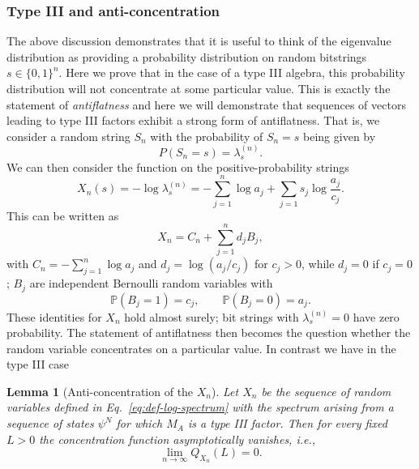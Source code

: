 \documentclass[aps,pra,reprint,superscriptaddress]{revtex4-2}
\renewcommand\l{\lambda}
\newtheorem{lemma}[theorem]{Lemma}
\theoremstyle{definition}
\theoremstyle{remark}
\begin{document}
    \subsubsection{Type III and anti-concentration}
    The above discussion demonstrates that it is useful to think of the
    eigenvalue distribution as providing a probability distribution on random
    bitstrings $s \in \{0,1 \}^n$.
    Here we prove that in the case of a type III algebra, this probability
    distribution will not concentrate at some particular value. This is 
    exactly the statement of \emph{antiflatness} \cite{Tirrito:2023fnw} and here we will
    demonstrate that sequences of vectors leading to type III factors exhibit a strong form
    of antiflatness.
    That is, we consider a random string $S_n$ with the probability
    of $S_n = s$ being given by 
    \begin{equation}
        P(S_n = s) = \l_s^{(n)}.
    \end{equation}
    We can then consider the function on the positive-probability strings
    \begin{equation}
        X_n(s)= - \log \l_s^{(n)} = -\sum_{j = 1}^{n} \log a_j + \sum_{j=1} s_j
        \log \frac{a_j}{c_j}.\label{eq:def-log-spectrum}
    \end{equation}
    This can be written as
    \begin{equation}
        X_n = C_n + \sum_{j=1}^{n} d_j B_j,
    \end{equation}
    with $C_n=-\sum_{j=1}^n\log a_j$ and $d_j = \log(a_j/c_j)$ for $c_j>0$, while $d_j=0$ if $c_j=0$; $B_j$ are independent Bernoulli random variables with
    \begin{equation}
        \mathbb{P}(B_j = 1) = c_j, \qquad \mathbb{P}(B_j = 0) = a_j.
    \end{equation}
    These identities for $X_n$ hold almost surely; bit strings with $\lambda_s^{(n)}=0$ have zero probability. The statement of antiflatness then becomes the question whether the random
    variable concentrates on a particular value. In contrast we have in the type III case 
    \begin{lemma}[Anti-concentration of the $X_n$] \label{lem:anti_concentration}
        Let $X_n$ be the sequence of random variables defined in Eq.~\eqref{eq:def-log-spectrum} with the spectrum arising from a sequence of states $\psi^N$ for which $M_A$ is a type III factor. Then for every fixed $L > 0 $ the concentration function asymptotically vanishes, i.e., 
        \begin{equation}
           \lim_{n\to \infty} Q_{X_n}(L) = 0.
        \end{equation}
        
    \end{lemma}
\end{document}

